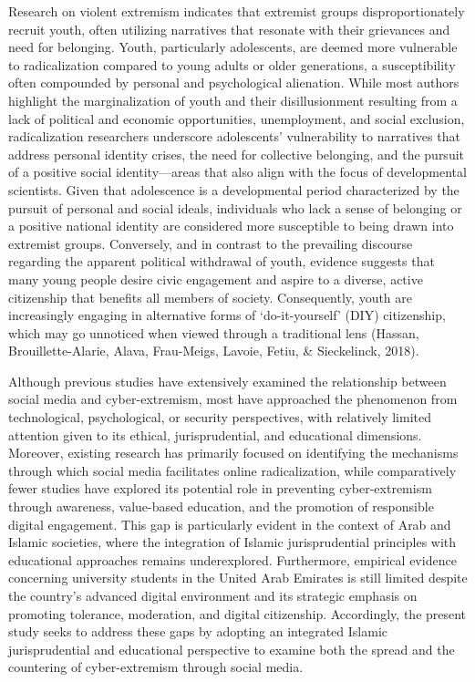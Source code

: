 \documentclass[10pt]{NSP1}
\begin{document}
	Research on violent extremism indicates that extremist groups disproportionately recruit youth, often utilizing narratives that resonate with their grievances and need for belonging. Youth, particularly adolescents, are deemed more vulnerable to radicalization compared to young adults or older generations, a susceptibility often compounded by personal and psychological alienation. While most authors highlight the marginalization of youth and their disillusionment resulting from a lack of political and economic opportunities, unemployment, and social exclusion, radicalization researchers underscore adolescents' vulnerability to narratives that address personal identity crises, the need for collective belonging, and the pursuit of a positive social identity—areas that also align with the focus of developmental scientists. Given that adolescence is a developmental period characterized by the pursuit of personal and social ideals, individuals who lack a sense of belonging or a positive national identity are considered more susceptible to being drawn into extremist groups. Conversely, and in contrast to the prevailing discourse regarding the apparent political withdrawal of youth, evidence suggests that many young people desire civic engagement and aspire to a diverse, active citizenship that benefits all members of society. Consequently, youth are increasingly engaging in alternative forms of `do-it-yourself' (DIY) citizenship, which may go unnoticed when viewed through a traditional lens (Hassan, Brouillette-Alarie, Alava, Frau-Meigs, Lavoie, Fetiu, \& Sieckelinck, 2018).
	
	Although previous studies have extensively examined the relationship between social media and cyber-extremism, most have approached the phenomenon from technological, psychological, or security perspectives, with relatively limited attention given to its ethical, jurisprudential, and educational dimensions. Moreover, existing research has primarily focused on identifying the mechanisms through which social media facilitates online radicalization, while comparatively fewer studies have explored its potential role in preventing cyber-extremism through awareness, value-based education, and the promotion of responsible digital engagement. This gap is particularly evident in the context of Arab and Islamic societies, where the integration of Islamic jurisprudential principles with educational approaches remains underexplored. Furthermore, empirical evidence concerning university students in the United Arab Emirates is still limited despite the country's advanced digital environment and its strategic emphasis on promoting tolerance, moderation, and digital citizenship. Accordingly, the present study seeks to address these gaps by adopting an integrated Islamic jurisprudential and educational perspective to examine both the spread and the countering of cyber-extremism through social media.
	
\end{document}
